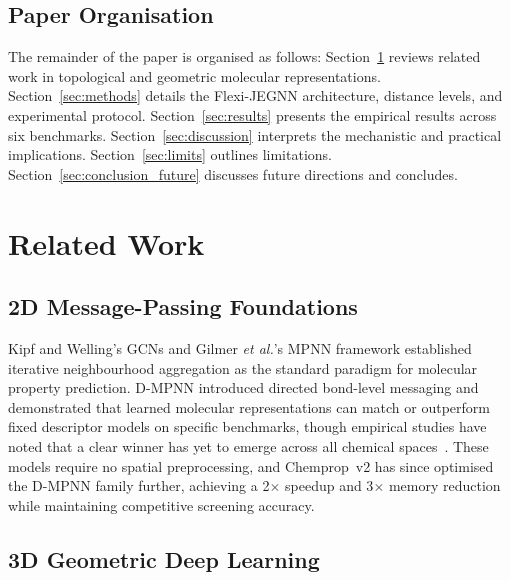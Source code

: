 \documentclass[pdflatex,sn-vancouver-num]{sn-jnl}%
\theoremstyle{thmstyleone}%
\theoremstyle{thmstyletwo}%
\theoremstyle{thmstylethree}%
\begin{document}
\subsection*{Paper Organisation} The remainder of the paper is organised as follows:
Section~\ref{sec:related} reviews related work in topological and geometric molecular representations.
Section~\ref{sec:methods} details the Flexi-JEGNN architecture, distance levels, and experimental protocol.
Section~\ref{sec:results} presents the empirical results across six benchmarks.
Section~\ref{sec:discussion} interprets the mechanistic and practical implications.
Section~\ref{sec:limits} outlines limitations. Section~\ref{sec:conclusion_future} discusses future directions and concludes.
\section{Related Work}
\label{sec:related}

\subsection{2D Message-Passing Foundations}

Kipf and Welling's GCNs \cite{kipf2017gcn} and Gilmer \emph{et al.}'s
MPNN framework \cite{gilmer2017mpnn} established iterative neighbourhood
aggregation as the standard paradigm for molecular property prediction.
D-MPNN \cite{yang2019dmpnn} introduced directed bond-level messaging and
demonstrated that learned molecular representations can match or outperform
fixed descriptor models on specific benchmarks, though empirical studies
have noted that a clear winner has yet to emerge across all chemical
spaces~\cite{yang2019dmpnn}.
These models require no spatial preprocessing, and
Chemprop~v2 \cite{graff2026chempropv2} has since optimised the D-MPNN
family further, achieving a 2$\times$ speedup and 3$\times$ memory
reduction while maintaining competitive screening accuracy.

\subsection{3D Geometric Deep Learning}
\end{document}
